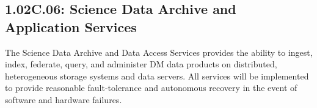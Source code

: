 \subsection{1.02C.06: Science Data Archive and Application Services}

The Science Data Archive and Data Access Services provides the ability to ingest, index, federate, query, and administer DM data products on distributed, heterogeneous storage systems and data servers. All services will be implemented to provide reasonable fault-tolerance and autonomous recovery in the event of software and hardware failures.

